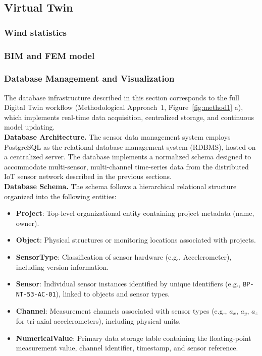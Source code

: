 \documentclass{eurodyn2026}
\begin{document}
\subsection{Virtual Twin}

\subsubsection{Wind statistics}
\subsubsection{BIM and FEM model}

\subsubsection{Database Management and Visualization}

\noindent The database infrastructure described in this section 
corresponds to the full Digital Twin workflow 
(Methodological Approach~1, Figure~\ref{fig:method1}
a), which implements real-time data acquisition, 
centralized storage, and continuous model updating. \\

\noindent \textbf{Database Architecture.} The sensor data management system employs PostgreSQL as the 
relational database management system (RDBMS), hosted on a centralized server. The database implements 
a normalized schema designed to accommodate multi-sensor, multi-channel time-series data 
from the distributed IoT sensor network described in the previous sections. \\

\noindent \textbf{Database Schema.} The schema follows a hierarchical relational structure organized into the following entities:
\begin{itemize}
    \item \textbf{Project}: Top-level organizational entity containing project metadata (name, owner).
    \item \textbf{Object}: Physical structures or monitoring locations associated with projects.
    \item \textbf{SensorType}: Classification of sensor hardware (e.g., Accelerometer), including version information.
    \item \textbf{Sensor}: Individual sensor instances identified by unique identifiers (e.g., \texttt{BP-NT-53-AC-01}), linked to objects and sensor types.
    \item \textbf{Channel}: Measurement channels associated with sensor types (e.g., $a_x$, $a_y$, $a_z$ for tri-axial accelerometers), including physical units.
    \item \textbf{NumericalValue}: Primary data storage table containing the floating-point measurement value, channel identifier, timestamp, and sensor reference.
\end{itemize}
\end{document}
